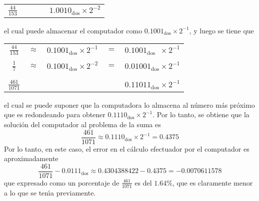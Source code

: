 \begin{solucion}
\begin{enumerate}
\begin{center}
\begin{tabular}{ccccc}
    $\frac{44}{153}$ & & & & $1.0010_{\text{dos}} \times 2^{-2}$
   \end{tabular}
  \end{center}
  el cual puede almacenar el computador como $0.1001_{\text{dos}} \times 2^{-1}$, y luego se tiene que
  \begin{center}
   \begin{tabular}{ccccc}
    $\frac{44}{153}$ & $\approx$ & $0.1001_{\text{dos}}\times 2^{-1}$ & $=$ & $0.1001_{\text{dos}} \phantom{0} \times 2^{-1}$ \\ 
    \vspace{-0.3cm} 
    \\
    $\frac{1}{7}$ & $\approx$ & $0.1001_{\text{dos}} \times 2^{-2}$ & $=$ & $0.01001_{\text{dos}} \times 2^{-1}$ \\
    \vspace{-0.4cm}
    \\
    \hhline{-~~~-}
    \vspace{-0.4cm}
    \\
    $\frac{461}{1071}$ & & & & $0.11011_{\text{dos}} \times 2^{-1}$
   \end{tabular}
  \end{center}
  el cual se puede suponer que la computadora lo almacena al n\'umero m\'as pr\'oximo que es redondeando para obtener $0.1110_{\text{dos}} \times 2^{-1}$. Por lo tanto, se obtiene que la soluci\'on del computador al problema de la suma es
  \begin{equation*}
   \frac{461}{1071} \approx 0.1110_{\text{dos}} \times 2^{-1} = 0.4375
  \end{equation*}
  Por lo tanto, en este caso, el error en el c\'alculo efectuador por el computador es aproximadamente
  \begin{equation*}
   \frac{461}{1071} - 0.0111_{\text{dos}} \approx 0.4304388422 - 0.4375 = -0.0070611578
  \end{equation*}
  que expresado como un porcentaje de $\frac{461}{1071}$ es del $1.64\%$, que es claramente menor a lo que se ten\'{\i}a previamente.


\end{enumerate}
\end{solucion}
